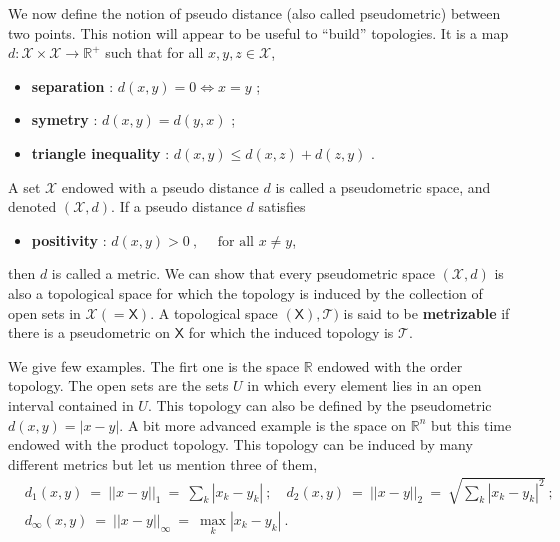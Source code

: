 \documentclass[10pt]{book}
\newcommand{\abs}[1]{\left|#1\right|}
\newcommand{\norm}[1]{\left|\left|#1\right|\right|}
\newcommand{\Tcal}{\mathcal{T}}
\newcommand{\Xcal}{\mathcal{X}}
\newcommand{\Rbb}{\mathbb{R}}
\newcommand{\Xsf}{\mathsf{X}}
\theoremstyle{break}
\begin{document}
We now define the notion of pseudo distance (also called pseudometric) between two points. This notion will appear to be useful to ``build'' topologies. It is a map $d : \Xcal \times \Xcal \to \Rbb^+$ such that for all $x, y, z \in \Xcal$,%
%
\begin{itemize}
\item \textbf{separation} : $d(x,y) = 0 \Leftrightarrow x=y$ ; 
\item \textbf{symetry} : $d(x,y) = d(y,x)$ ;
\item \textbf{triangle inequality} : $d(x,y) \leq d(x,z) + d(z,y)$ .
\end{itemize}
%
A set $\Xcal$ endowed with a pseudo distance $d$ is called a pseudometric space, and denoted $(\Xcal,d)$. If a pseudo distance $d$ satisfies%
%
\begin{itemize}
\item \textbf{positivity} : $d(x,y) > 0 \ , \quad \mbox{ for all } x \neq y$,
\end{itemize}
%
then $d$ is called a metric. We can show that every pseudometric space $(\Xcal,d)$ is also a topological space for which the topology is induced by the collection of open sets in $\Xcal(=\Xsf)$. A topological space $(\Xsf),\Tcal)$ is said to be \textbf{metrizable} if there is a pseudometric on $\Xsf$ for which the induced topology is $\Tcal$.


\bigskip


We give few examples. The firt one is the space $\Rbb$ endowed with the order topology. The open sets are the sets $U$ in which every element lies in an open interval contained in $U$. This topology can also be defined by the pseudometric $d(x,y) = \abs{x-y}$. 
A bit more advanced example is the space on $\Rbb^n$ but this time endowed with the product topology. This topology can be induced by many different metrics but let us mention three of them,
%
\begin{eqnarray*}
&d_1(x,y) \ = \ \norm{x-y}_1 \ = \ \sum_k \abs{x_k - y_k} \ ; \quad 
d_2(x,y) \ = \ \norm{x-y}_2 \ = \ \sqrt{ \sum_k \abs{x_k - y_k}^2 } \ ;& \\
&d_\infty(x,y) \ = \ \norm{x-y}_\infty \ = \ \max_k \abs{x_k - y_k} \ .&
\end{eqnarray*}
\end{document}

